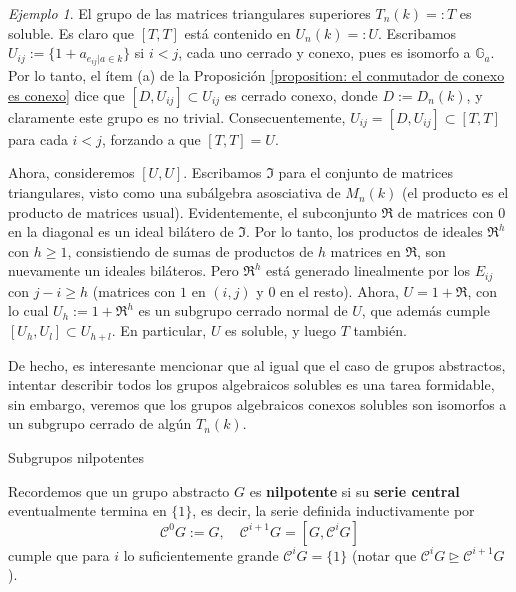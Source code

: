 \documentclass[spanish,10pt]{amsart}
\makeatletter
\renewcommand\subsection{\@startsection{subsection}{2}%
  \z@{.5\linespacing\@plus.7\linespacing}{-.5em}%
  {\normalfont\sffamily}}
\theoremstyle{definition}
\theoremstyle{remark}
\newtheorem{example}[theorem]{Ejemplo}
\numberwithin{equation}{section}
\makeatother
\begin{document}
\begin{example}\label{example:matrices triangulares superiores es soluble y el de las matrices unipontentes es nilpotente}
El grupo de las matrices triangulares superiores $T_n (k)=:T$ es soluble. Es claro que $[T,T]$ está contenido en $U_n (k) =: U$. Escribamos $U_{ij} := \{1 + a_{e_{ij} | a \in k}\}$ si $i < j$, cada uno cerrado y conexo, pues es isomorfo a $\mathbb{G}_a$. Por lo tanto, el ítem (a) de la Proposición \ref{proposition: el conmutador de conexo es conexo} dice que $[D, U_{ij}] \subset U_{ij}$ es cerrado conexo, donde $D := D_n (k)$, y claramente este grupo es no trivial. Consecuentemente, $U_{ij} = [D, U_{ij}] \subset [T,T]$ para cada $i<j$, forzando a que $[T,T] = U$.

Ahora, consideremos $[U,U]$. Escribamos $\mathfrak I$ para el conjunto de matrices triangulares, visto como una subálgebra asosciativa de $M_n (k)$ (el producto es el producto de matrices usual). Evidentemente, el subconjunto $\mathfrak R$ de matrices con $0$ en la diagonal es un ideal bilátero de $\mathfrak I$. Por lo tanto, los productos de ideales $\mathfrak R^h$ con $h \geq 1$, consistiendo de sumas de productos de $h$ matrices en $\mathfrak R$, son nuevamente un ideales biláteros. Pero $\mathfrak R^h$ está generado linealmente por los $E_{ij}$ con $j - i \geq h$ (matrices con $1$ en $(i,j)$ y $0$ en el resto). Ahora, $U = 1 + \mathfrak R$, con lo cual $U_h := 1 + \mathfrak R^h$ es un subgrupo cerrado normal de $U$, que además cumple $[U_h, U_l] \subset U_{h+ l}$. En particular, $U$ es soluble, y luego $T$ también.
\end{example}

De hecho, es interesante mencionar que al igual que el caso de grupos abstractos, intentar describir todos los grupos algebraicos solubles es una tarea formidable, sin embargo, veremos que los grupos algebraicos conexos solubles son isomorfos a un subgrupo cerrado de algún $T_n (k)$.


\subsection{Subgrupos nilpotentes}


Recordemos que un grupo abstracto $G$ es \textbf{nilpotente} si su \textbf{serie central} eventualmente termina en $\{1\}$, es decir, la serie definida inductivamente por
\[
    \mathcal C ^0 G :=G, \quad \mathcal C^{i + 1} G = [ G, \mathcal C^i G]
\]
cumple que para $i$ lo suficientemente grande $\mathcal C^i G = \{1\}$ (notar que $\mathcal C ^i G \unrhd \mathcal C^{i + 1} G$).
\end{document}
